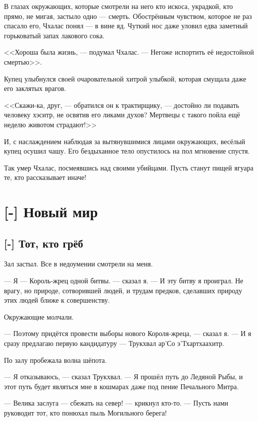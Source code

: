 \textspace

В глазах окружающих, которые смотрели на него кто искоса, украдкой, кто прямо, не мигая, застыло одно --- смерть.
Обострённым чувством, которое не раз спасало его, Чхалас понял --- в вине яд.
Чуткий нос даже уловил едва заметный горьковатый запах лакового сока.

<<Хороша была жизнь, --- подумал Чхалас.
--- Негоже испортить её недостойной смертью>>.

Купец улыбнулся своей очаровательной хитрой улыбкой, которая смущала даже его заклятых врагов.

<<Скажи-ка, друг, --- обратился он к трактирщику, --- достойно ли подавать человеку хэситр, не освятив его ликами духов?
Мертвецы с такого пойла ещё неделю животом страдают!>>

И, с наслаждением наблюдая за вытянувшимися лицами окружающих, весёлый купец осушил чашу.
Его бездыханное тело опустилось на пол мгновение спустя.

Так умер Чхалас, посмеявшись над своими убийцами.
Пусть станут пищей ягуара те, кто рассказывает иначе!

\chapter{[-] Новый мир}

\section{[-] Тот, кто грёб}

\textspace

Зал застыл.
Все в недоумении смотрели на меня.

--- Я --- Король-жрец одной битвы. --- сказал я.
--- И эту битву я проиграл.
Не врагу, но природе, сотворившей людей, и трудам предков, сделавших природу этих людей ближе к совершенству.

Окружающие молчали.

--- Поэтому придётся провести выборы нового Короля-жреца, --- сказал я.
--- И я сразу предлагаю первую кандидатуру --- Трукхвал ар'Со э'Тхартхаахитр.

По залу пробежала волна шёпота.

--- Я отказываюсь, --- сказал Трукхвал.
--- Я прошёл путь до Ледяной Рыбы, и этот путь будет являться мне в кошмарах даже под пение Печального Митра.

--- Велика заслуга --- сбежать на север! --- крикнул кто-то.
--- Пусть нами руководит тот, кто понюхал пыль Могильного берега!

